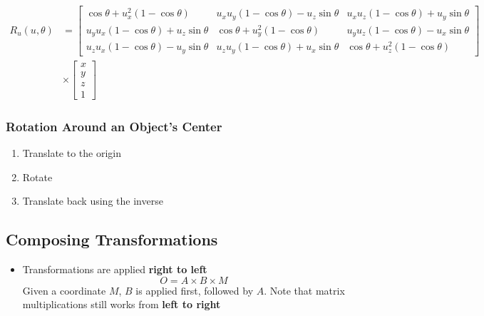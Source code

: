   \begin{align*}
    R_{u}\left( u, \theta \right) &=
    \begin{bmatrix}
      \cos\theta + u_{x}^{2}\left( 1 - \cos\theta \right)
      & u_{x} u_{y} \left( 1 - \cos\theta \right) - u_{z} \sin\theta
      & u_{x} u_{z} \left( 1 - \cos\theta \right) + u_{y} \sin\theta \\
      u_{y} u_{x} \left( 1 - \cos\theta \right) + u_{z} \sin\theta
      & \cos\theta + u_{y}^{2}\left( 1 - \cos\theta \right)
      & u_{y} u_{z} \left( 1 - \cos\theta \right) - u_{x} \sin\theta \\
      u_{z} u_{x} \left( 1 - \cos\theta \right) - u_{y} \sin\theta
      & u_{z} u_{y} \left( 1 - \cos\theta \right) + u_{x} \sin\theta
      & \cos\theta + u_{z}^{2}\left( 1 - \cos\theta \right)
    \end{bmatrix} \\
    &\times
    \begin{bmatrix}
      x \\
      y \\
      z \\
      1
    \end{bmatrix}
  \end{align*}

  \subsubsection{Rotation Around an Object's Center}

    \begin{enumerate}
      \item Translate to the origin
      \item Rotate
      \item Translate back using the inverse
    \end{enumerate}

\subsection{Composing Transformations}

  \begin{itemize}
    \item Transformations are applied \textbf{right to left}
    \begin{equation*}
      O = A \times B \times M
    \end{equation*}
    Given a coordinate $ M $, $ B $ is applied first, followed by $ A $. Note
    that matrix multiplications still works from \textbf{left to right}
  \end{itemize}

